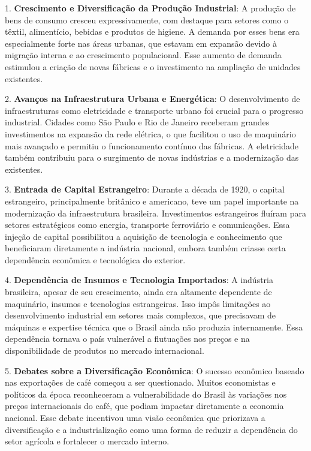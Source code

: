 \documentclass[a4paper,12pt]{article}[abntex2]
\begin{document}
1. \textbf{Crescimento e Diversificação da Produção Industrial}: A produção de bens de consumo cresceu expressivamente, com destaque para setores como o têxtil, alimentício, bebidas e produtos de higiene. A demanda por esses bens era especialmente forte nas áreas urbanas, que estavam em expansão devido à migração interna e ao crescimento populacional. Esse aumento de demanda estimulou a criação de novas fábricas e o investimento na ampliação de unidades existentes.

2. \textbf{Avanços na Infraestrutura Urbana e Energética}: O desenvolvimento de infraestruturas como eletricidade e transporte urbano foi crucial para o progresso industrial. Cidades como São Paulo e Rio de Janeiro receberam grandes investimentos na expansão da rede elétrica, o que facilitou o uso de maquinário mais avançado e permitiu o funcionamento contínuo das fábricas. A eletricidade também contribuiu para o surgimento de novas indústrias e a modernização das existentes.

3. \textbf{Entrada de Capital Estrangeiro}: Durante a década de 1920, o capital estrangeiro, principalmente britânico e americano, teve um papel importante na modernização da infraestrutura brasileira. Investimentos estrangeiros fluíram para setores estratégicos como energia, transporte ferroviário e comunicações. Essa injeção de capital possibilitou a aquisição de tecnologia e conhecimento que beneficiaram diretamente a indústria nacional, embora também criasse certa dependência econômica e tecnológica do exterior.

4. \textbf{Dependência de Insumos e Tecnologia Importados}: A indústria brasileira, apesar de seu crescimento, ainda era altamente dependente de maquinário, insumos e tecnologias estrangeiras. Isso impôs limitações ao desenvolvimento industrial em setores mais complexos, que precisavam de máquinas e expertise técnica que o Brasil ainda não produzia internamente. Essa dependência tornava o país vulnerável a flutuações nos preços e na disponibilidade de produtos no mercado internacional.

5. \textbf{Debates sobre a Diversificação Econômica}: O sucesso econômico baseado nas exportações de café começou a ser questionado. Muitos economistas e políticos da época reconheceram a vulnerabilidade do Brasil às variações nos preços internacionais do café, que podiam impactar diretamente a economia nacional. Esse debate incentivou uma visão econômica que priorizava a diversificação e a industrialização como uma forma de reduzir a dependência do setor agrícola e fortalecer o mercado interno.
\end{document}
